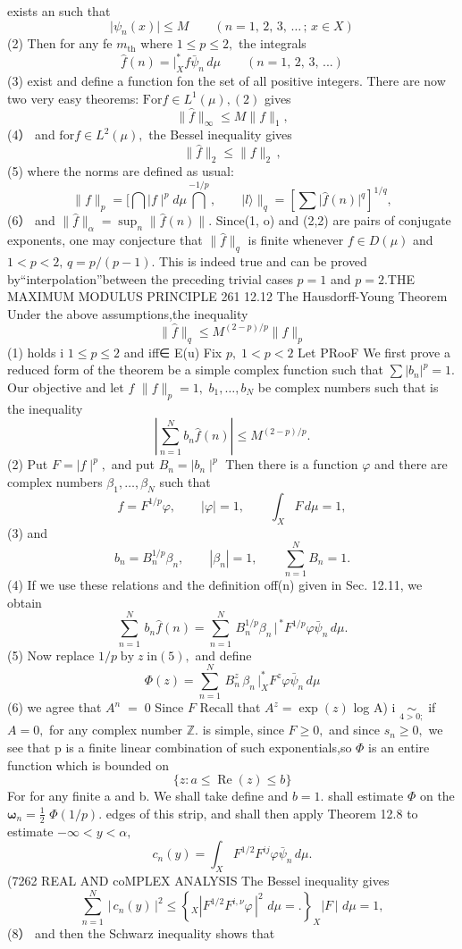 exists an such that $$ \vert\psi_{n}(x)\vert\leq M\qquad(n=1,\,2,\,3,\,\ldots\,;\,x\in X) $$ (2) Then for any fe $\scriptstyle{m_{\mathrm{th}}}$ where $1\leq p\leq2,$ the integrals $$ \hat{f}(n)= |_{X}^{*}f\bar{\psi}_{n}\,d\mu\qquad(n=1,\,2,\,3,\,...) $$ (3) exist and define a function fon the set of all positive integers. There are now two very easy theorems: ${\mathrm{For}}f\in L^{1}(\mu),(2)$ gives $$ \|{\hat{f}}\|_{\infty}\leq M\|f\|_{1}, $$ (4） and $\mathrm{for}f\in L^{2}(\mu),$ the Bessel inequality gives $$ \|{\hat{f}}\|_{2}\leq\|f\|_{2}\,, $$ (5) where the norms are defined as usual: $$ \|f\|_{p}={\biggl[}\bigcap\vert f\mid^{p}d\mu\bigcap^{-1/p},\qquad\vert l\rangle\|_{q}=[\sum\vert{\hat{f}}(n)\vert^{q}]^{1/q}, $$ (6） and $\|{\hat{f}}\|_{\alpha}=\operatorname*{sup}_{n}\|{\hat{f}}(n)\|.$ Since(1, o) and (2,2) are pairs of conjugate exponents, one may conjecture that $\|{\hat{f}}\|_{q}$ is finite whenever $f\in D(\mu)$ and $1<p<2,\,q=p/(p-1).$ This is indeed true and can be proved by“interpolation”between the preceding trivial cases $p=1$ and $p=2.$THE MAXIMUM MODULUS PRINCIPLE 261 12.12 The Hausdorff-Young Theorem Under the above assumptions,the inequality $$ \|{\hat{f}}\|_{q}\leq M^{(2-p)/p}\|f\|_{p} $$ (1) holds i $1\leq p\leq2$ and iff∈ E(u) Fix $p,\;1<p<2$ Let PRooF We first prove a reduced form of the theorem be a simple complex function such that $\textstyle\sum|b_{n}|^{p}=1.$ Our objective and let $\boldsymbol{\mathit{f}}$ $\|f\|_{p}=1,$ $b_{1},\ldots,b_{N}$ be complex numbers such that is the inequality $$ \left|\sum_{n=1}^{N}b_{n}{\hat{f}}(n)\right|\leq M^{(2-p)/p}. $$ (2) Put $F=\mid f\mid^{p},$ and put $B_{n}=\mid b_{n}\mid^{p}$ Then there is a function $\varphi$ and there are complex numbers $\beta_{1},\ldots,\beta_{N}$ such that $$ f=F^{1/p}\varphi,\qquad|\varphi|=1,\qquad\int_{X}F\,d\mu=1, $$ (3) and $$ b_{n}=B_{n}^{1/p}\beta_{n},\qquad|\beta_{n}|=1,\qquad\sum_{n=1}^{N}B_{n}=1. $$ (4) If we use these relations and the definition off(n) given in Sec. 12.11, we obtain $$ \sum_{n=1}^{N}\,b_{n}\hat{f}(n)=\sum_{n=1}^{N}\,B_{n}^{1/p}\beta_{n}\,\Bigg|^{\,*}F^{1/p}\varphi\bar{\psi}_{n}\,d\mu. $$ (5) Now replace $1/p\;\mathrm{by}\;z\;\mathrm{in}\left(5\right),$ and define $$ \Phi(z)=\sum_{n=1}^{N}\,B_{n}^{z}\,\beta_{n}\,\Bigg|_{X}^{*}F^{z}\varphi\bar{\psi}_{n}\,d\mu $$ (6) we agree that $\scriptstyle A^{n}\;=\;0$ Since ${\mathbf{}}F$ Recall that $A^{z}=\exp{(z)}$ log A) i ${\underset{4>0;}{\sim}}$ if $A=0,$ for any complex number $\mathbb{Z}.$ is simple, since $F\geq0,$ and since $s_{n}\geq0,$ we see that p is a finite linear combination of such exponentials,so $\Phi$ is an entire function which is bounded on $$ \{z\colon a\leq\operatorname{Re}(z)\leq b\} $$ For for any finite a and b. We shall take define and $b=1.$ shall estimate $\Phi$ on the $\mathbf{\omega}_{n}={\frac{1}{2}}$ $\Phi(1/p).$ edges of this strip, and shall then apply Theorem 12.8 to estimate $-\infty<y<\alpha,$ $$ c_{n}(y)=\int_{X}F^{1/2}F^{i j}\varphi\bar{\psi}_{n}\,d\mu. $$ (7262 REAL AND coMPLEX ANALYSIS The Bessel inequality gives $$ \sum_{n=1}^{N}\,|\,c_{n}(y)\,|^{2}\leq\left\{{}_{X}|F^{1/2}F^{i,\nu}\varphi\,|^{2}\,\,d\mu= .\right\}_{X}^{}|F\,|\,\,d\mu=1, $$ (8） and then the Schwarz inequality shows that $$ 